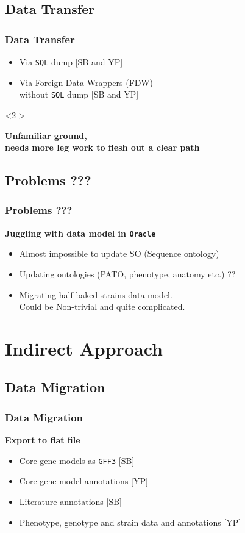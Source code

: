 \documentclass[hyperref={pdfpagelabels=false}, compress]{beamer}
\begin{document}
\subsection{Data Transfer}
\begin{frame}
    \frametitle{Data Transfer}  
	\begin{itemize}
		\item<1-> Via \texttt{SQL} dump [SB and YP]
		\item<1-> Via Foreign Data Wrappers (FDW)\\ without \texttt{SQL} dump [SB and YP]
	\end{itemize} 
	
	\vspace{1cm}

	\begin{block}{}<2->
  		\begin{center}
  			\textbf{\large Unfamiliar ground,\\ needs more leg work to flesh out a clear path}
		\end{center}
	\end{block}
\end{frame}

\subsection{Problems ???}
\begin{frame}
    \frametitle{Problems ???}  
	\textbf{\Large Juggling with data model in \texttt{Oracle}}
	\begin{itemize}
		\item Almost impossible to update SO (Sequence ontology)
		\item Updating ontologies (PATO, phenotype, anatomy etc.) ??
		\item Migrating half-baked strains data model.\\ Could be Non-trivial and quite complicated.
	\end{itemize} 
\end{frame}


\section{Indirect Approach}

\subsection{Data Migration}
\begin{frame}
    \frametitle{Data Migration} 
	\textbf{\Large Export to flat file}
	\begin{itemize}
		\item Core gene models as \texttt{GFF3} [SB]
		\item Core gene model annotations [YP]
		\item Literature annotations [SB]
		\item Phenotype, genotype and strain data and annotations [YP]
	\end{itemize}
        
\end{frame}
\end{document}
